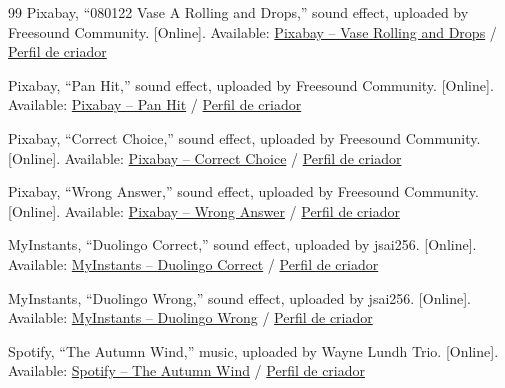 \documentclass[12pt,a4paper,oneside]{report}
\begin{document}
\begin{thebibliography}{99}
Pixabay, ``080122 Vase A Rolling and Drops,'' sound effect, uploaded by Freesound Community. [Online]. Available:
\href{https://pixabay.com/pt/sound-effects/filme-e-efeitos-especiais-080122-vase-a-rolling-and-drops-000clip-0002-83061/}{Pixabay -- Vase Rolling and Drops} / 
\href{https://pixabay.com/pt/users/freesound_community-46691455/}{Perfil de criador}

Pixabay, ``Pan Hit,'' sound effect, uploaded by Freesound Community. [Online]. Available:
\href{https://pixabay.com/pt/sound-effects/dom%C3%A9stico-pan-hit-87588/}{Pixabay -- Pan Hit} / 
\href{https://pixabay.com/pt/users/freesound_community-46691455/}{Perfil de criador}

Pixabay, ``Correct Choice,'' sound effect, uploaded by Freesound Community. [Online]. Available:
\href{https://pixabay.com/pt/sound-effects/filme-e-efeitos-especiais-correct-choice-43861/}{Pixabay -- Correct Choice} / 
\href{https://pixabay.com/pt/users/freesound_community-46691455/}{Perfil de criador}

Pixabay, ``Wrong Answer,'' sound effect, uploaded by Freesound Community. [Online]. Available:
\href{https://pixabay.com/pt/sound-effects/filme-e-efeitos-especiais-wronganswer-37702/}{Pixabay -- Wrong Answer} / 
\href{https://pixabay.com/pt/users/freesound_community-46691455/}{Perfil de criador}

MyInstants, ``Duolingo Correct,'' sound effect, uploaded by jsai256. [Online]. Available:
\href{https://www.myinstants.com/en/instant/duolingo-correct-95922/}{MyInstants -- Duolingo Correct} / 
\href{https://www.myinstants.com/en/profile/jsai256/uploaded/}{Perfil de criador}

MyInstants, ``Duolingo Wrong,'' sound effect, uploaded by jsai256. [Online]. Available:
\href{https://www.myinstants.com/en/instant/duolingo-wrong-12298/}{MyInstants -- Duolingo Wrong} / 
\href{https://www.myinstants.com/en/profile/jsai256/uploaded/}{Perfil de criador}

Spotify, ``The Autumn Wind,'' music, uploaded by Wayne Lundh Trio. [Online]. Available:
\href{https://open.spotify.com/track/6ozGMSCHBd597JUQFLkOOj}{Spotify -- The Autumn Wind} /
\href{https://open.spotify.com/artist/1l4ckkpkgNfemTetqUQvN4}{Perfil de criador}

\end{thebibliography}
\end{document}
